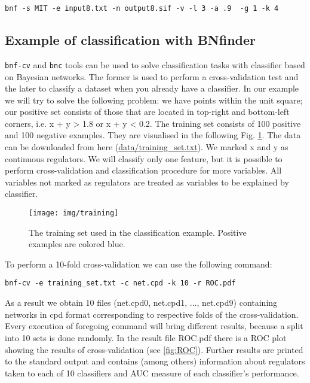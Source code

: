 \begin{verbatim}
bnf -s MIT -e input8.txt -n output8.sif -v -l 3 -a .9  -g 1 -k 4
\end{verbatim}


\subsection{Example of classification with BNfinder}

\texttt{bnf-cv} and \texttt{bnc} tools can be used to solve classification tasks with classifier based on Bayesian networks. The former is used to perform a cross-validation test and the later to classify a dataset when you already have a classifier. In our example we will try to solve the following problem: we have points within the unit square; our positive set consists of those that are located in top-right and bottom-left corners, i.e. x + y > 1.8 or x + y < 0.2. The training set consists of 100 positive and 100 negative examples. They are visualised in the following Fig. \ref{fig:training}. The data can be downloaded from here (\url{data/training\_set.txt}). We marked x and y as continuous regulators. We will classify only one feature, but it is possible to perform cross-validation and classification procedure for more variables. All variables not marked as regulators are treated as variables to be explained by classifier.

\begin{figure}[h]
  \centering
   \texttt{[image: img/training]}
  \caption{The training set used in the classification example. Positive examples are colored blue. }
  \label{fig:training}
\end{figure}

To perform a 10-fold cross-validation we can use the following command:
\begin{verbatim}
bnf-cv -e training_set.txt -c net.cpd -k 10 -r ROC.pdf
\end{verbatim}

As a result we obtain 10 files (net.cpd0, net.cpd1, ..., net.cpd9) containing networks in cpd format corresponding to respective folds of the cross-validation. Every execution of foregoing command will bring different results, because a split into 10 sets is done randomly. In the result file ROC.pdf there is a ROC plot showing the results of cross-validation (see \ref{fig:ROC}). Further results are printed to the standard output and contains (among others) information about regulators taken to each of 10 classifiers and AUC measure of each classifier's performance. 


